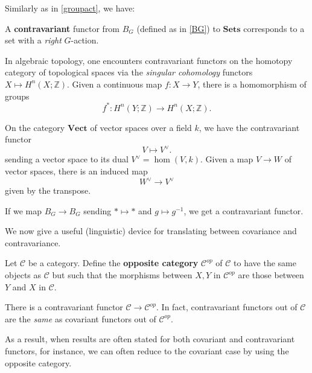 Similarly as in \cref{groupact}, we have:

\begin{example}
A \textbf{contravariant} functor from $B_G$ (defined as in \cref{BG}) to $\mathbf{Sets}$ corresponds to a
set with a \emph{right} $G$-action.
\end{example}

\begin{example}
In algebraic topology, one encounters contravariant functors on the homotopy
category of topological spaces via the \emph{singular cohomology} functors $X
\mapsto H^n(X; \mathbb{Z})$. Given a continuous map $f: X \to Y$, there is a
homomorphism of groups
\[ f^* : H^n(Y; \mathbb{Z}) \to H^n(X; \mathbb{Z}).  \]
\end{example} 

\begin{example} \label{dualspace}
On the category $\mathbf{Vect}$ of vector spaces over a field $k$, we
have
the contravariant functor
\[ V \mapsto V^{\vee}.  \]
sending a vector space to its dual $V^{\vee} = \hom(V,k)$.
Given a map $V \to W$ of vector spaces, there is an induced map
\[ W^{\vee} \to V^{\vee}  \]
given by the transpose.
\end{example}

\begin{example}
If we map $B_G \to B_G$ sending $\ast \mapsto \ast$ and $g \mapsto g^{-1}$, we
get a
contravariant functor.
\end{example}

We now give a useful (linguistic) device for translating between covariance and
contravariance. 

\begin{definition} \label{oppositecategory}
Let $\mathcal{C}$ be a category. Define the \textbf{opposite category}
$\mathcal{C}^{op}$ of $\mathcal{C}$ to have the same objects as
$\mathcal{C}$  but such that the morphisms between $X,Y$ in
$\mathcal{C}^{op}$
are those between $Y$ and $X$ in $\mathcal{C}$.
\end{definition}

There is a contravariant functor $\mathcal{C} \to
\mathcal{C}^{op}$.
In fact, contravariant functors out of $\mathcal{C}$ are the \emph{same} as
covariant functors out of $\mathcal{C}^{op}$.

As a result, when results are often stated for both covariant and contravariant
functors, for instance, we can often reduce to the covariant case by using the
opposite category.

